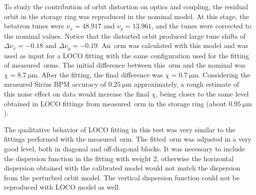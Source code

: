 To study the contribution of orbit distortion on optics and coupling, the residual orbit in the storage ring was reproduced in the nominal model. At this stage, the betatron tunes were $\nu_x = 48.917$ and $\nu_y = 13.961$, and the tunes were corrected to the nominal values. Notice that the distorted orbit produced large tune shifts of $\Delta \nu_x = -0.18$ and $\Delta \nu_y = -0.19$. An~\gls{orm} was calculated with this model and was used as input for a LOCO fitting with the same configuration used for the fitting of measured~\gls{orm}s. The initial difference between this~\gls{orm} and the nominal was $\chi = \SI{8.7}{\micro\meter}$. After the fitting, the final difference was $\chi = \SI{0.7}{\micro\meter}$. Considering the measured Sirius BPM accuracy of $\SI{0.25}{\micro\meter}$ approximately, a rough estimate of this noise effect on data would increase the final $\chi$, being closer to the same level obtained in LOCO fittings from measured~\gls{orm} in the storage ring (about $\SI{0.95}{\micro\meter}$).

The qualitative behavior of LOCO fitting in this test was very similar to the fittings performed with the measured~\gls{orm}. The fitted~\gls{orm} was adjusted in a very good level, both in diagonal and off-diagonal blocks. It was necessary to include the dispersion function in the fitting with weight $2$, otherwise the horizontal dispersion obtained with the calibrated model would not match the dispersion from the perturbed orbit model. The vertical dispersion function could not be reproduced with LOCO model as well. 

